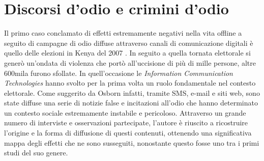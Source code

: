 \section{Discorsi d'odio e crimini d'odio}
Il primo caso conclamato di effetti estremamente negativi nella vita offline a seguito di campagne di odio diffuse attraverso canali di comunicazione digitali è quello delle elezioni in Kenya del 2007 \citep{osborn2008}. In seguito a quella tornata elettorale si generò un’ondata di violenza che portò all'uccisione di più di mille persone, altre 600mila furono sfollate. In quell'occasione le \textit{Information Communication Technologies} hanno svolto per la prima volta un ruolo fondamentale nel contesto elettorale. Come suggerito da Osborn infatti, tramite SMS, e-mail e siti web, sono state diffuse una serie di notizie false e incitazioni all'odio che hanno determinato un contesto sociale estremamente instabile e pericoloso. Attraverso un grande numero di interviste e osservazioni partecipate, l'autore è riuscito a ricostruire l'origine e la forma di diffusione di questi contenuti, ottenendo una significativa mappa degli effetti che ne sono susseguiti, nonostante questo fosse uno tra i primi studi del suo genere.


